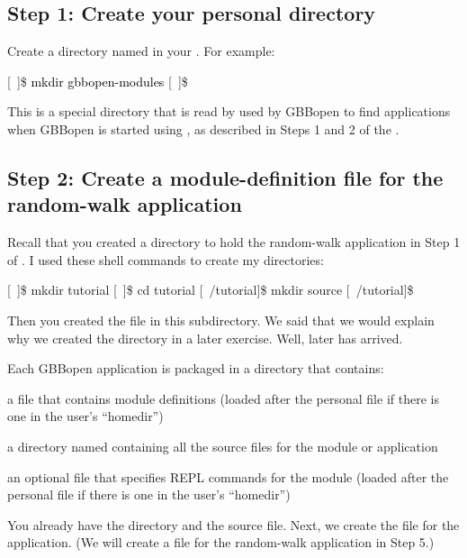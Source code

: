 \documentclass[10pt,twoside,english,pdftex]{article}
\begin{document}
\subsection*{Step 1: Create your personal  directory}

Create a directory named  in your
.  For example:
%
\W\supp
\begin{example}
\textcolor{darkergray}{%
  [~]\$ \textcolor{black}{mkdir gbbopen-modules}
  [~]\$}
\end{example}
%
This is a special directory that is read by used by GBBopen to find
applications when GBBopen is started using
, as described in Steps 1 and
2 of the .

\subsection*{Step 2: Create a module-definition file for the random-walk application}

Recall that you created a directory to hold the random-walk application in
Step 1 of .  I used these
shell commands to create my directories:
%
\W\supp
\begin{example}
\textcolor{darkergray}{%
  [~]\$ mkdir tutorial
  [~]\$ cd tutorial
  [~/tutorial]\$ mkdir source
  [~/tutorial]\$}
\end{example}
%
Then you created the  file in this
 subdirectory. We said that we would explain why we created the
 directory in a later exercise.  Well, later has arrived.

Each GBBopen application is packaged in a directory that contains:
\begin{tightitemize}
\item a  file that contains module definitions
  (loaded after the personal  file if there is
  one in the user's ``homedir'')
\item a directory named  containing all the source files for the
  module or application
\item an optional  file that specifies REPL
  commands for the module (loaded after the personal
   file if there is one in the user's
  ``homedir'')
\end{tightitemize}
%
You already have the  directory and the
 source file.  Next, we create the
 file for the application.  (We will create a
 file for the random-walk application in Step 5.)
\end{document}

